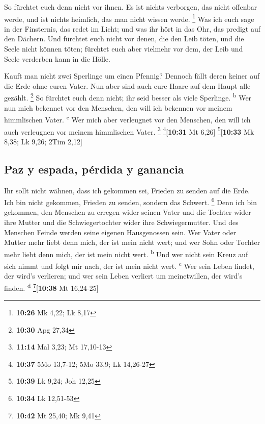  So fürchtet euch denn nicht vor ihnen. Es ist nichts
verborgen, das nicht offenbar werde, und ist nichts heimlich, das man
nicht wissen werde. \footnote{\textbf{10:26} Mk 4,22; Lk 8,17}
 Was ich euch sage in der Finsternis, das redet im Licht;
und was ihr hört in das Ohr, das predigt auf den Dächern.
 Und fürchtet euch nicht vor denen, die den Leib töten,
und die Seele nicht können töten; fürchtet euch aber vielmehr vor dem,
der Leib und Seele verderben kann in die Hölle.

 Kauft man nicht zwei Sperlinge um einen Pfennig? Dennoch
fällt deren keiner auf die Erde ohne euren Vater.  Nun
aber sind auch eure Haare auf dem Haupt alle gezählt. \footnote{\textbf{10:30}
  Apg 27,34}  So fürchtet euch denn nicht; ihr seid
besser als viele Sperlinge. \textsuperscript{b}  Wer nun
mich bekennet vor den Menschen, den will ich bekennen vor meinem
himmlischen Vater. \textsuperscript{c}  Wer mich aber
verleugnet vor den Menschen, den will ich auch verleugnen vor meinem
himmlischen Vater. \footnote{\textbf{11:14} Mal 3,23; Mt 17,10-13}
\footnote{\textbf{10:37} 5Mo 13,7-12; 5Mo 33,9; Lk 14,26-27}{[}\textbf{10:31}
Mt 6,26{]} \footnote{\textbf{10:39} Lk 9,24; Joh 12,25}{[}\textbf{10:33}
Mk 8,38; Lk 9,26; 2Tim 2,12{]}

\hypertarget{paz-y-espada-puxe9rdida-y-ganancia}{%
\subsection{Paz y espada, pérdida y
ganancia}\label{paz-y-espada-puxe9rdida-y-ganancia}}

 Ihr sollt nicht wähnen, dass ich gekommen sei, Frieden
zu senden auf die Erde. Ich bin nicht gekommen, Frieden zu senden,
sondern das Schwert. \footnote{\textbf{10:34} Lk 12,51-53}
 Denn ich bin gekommen, den Menschen zu erregen wider
seinen Vater und die Tochter wider ihre Mutter und die Schwiegertochter
wider ihre Schwiegermutter.  Und des Menschen Feinde
werden seine eigenen Hausgenossen sein.  Wer Vater oder
Mutter mehr liebt denn mich, der ist mein nicht wert; und wer Sohn oder
Tochter mehr liebt denn mich, der ist mein nicht wert.
\textsuperscript{b}  Und wer nicht sein Kreuz auf sich
nimmt und folgt mir nach, der ist mein nicht wert. \textsuperscript{c}
 Wer sein Leben findet, der wird's verlieren; und wer
sein Leben verliert um meinetwillen, der wird's finden.
\textsuperscript{d} \footnote{\textbf{10:42} Mt 25,40; Mk 9,41}{[}\textbf{10:38}
Mt 16,24-25{]}


